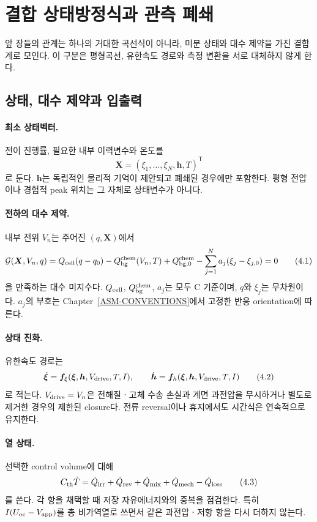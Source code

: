 \section{결합 상태방정식과 관측 폐쇄}\label{BAL-CH4}

앞 장들의 관계는 하나의 거대한 곡선식이 아니라, 미분 상태와
대수 제약을 가진 결합계로 모인다. 이 구분은 평형곡선, 유한속도
경로와 측정 변환을 서로 대체하지 않게 한다.

\subsection{상태, 대수 제약과 입출력}

\paragraph{ 최소 상태벡터.}
전이 진행률, 필요한 내부 이력변수와 온도를
\[
 \bm X=(\xi_1,\ldots,\xi_N,\bm h,T)^{\mathsf T}
\]
로 둔다. $\bm h$는 독립적인 물리적 기억이 제안되고 폐쇄된 경우에만
포함한다. 평형 전압이나 경험적 peak 위치는 그 자체로 상태변수가
아니다.

\paragraph{ 전하의 대수 제약.}
내부 전위 $V_n$는 주어진 $(q,\bm X)$에서
\[
 \mathcal G(\bm X,V_n,q)
 =Q_{\mathrm{cell}}(q-q_0)-Q_{\mathrm{bg}}^{\mathrm{chem}}(V_n,T)
 +Q_{\mathrm{bg},0}^{\mathrm{chem}}
 -\sum_{j=1}^{N}a_j(\xi_j-\xi_{j,0})=0
 \tag{4.1}
\]
을 만족하는 대수 미지수다. $Q_{\mathrm{cell}}$, $Q_{\mathrm{bg}}^{\mathrm{chem}}$, $a_j$는 모두
C 기준이며, $q$와 $\xi_j$는 무차원이다. $a_j$의 부호는
Chapter~\ref{ASM-CONVENTIONS}에서 고정한 반응 orientation에 따른다.

\paragraph{ 상태 진화.}
유한속도 경로는
\[
 \dot{\bm\xi}=\bm f_\xi(\bm\xi,\bm h,V_{\mathrm{drive}},T,I),\qquad
 \dot{\bm h}=\bm f_h(\bm\xi,\bm h,V_{\mathrm{drive}},T,I)
 \tag{4.2}
\]
로 적는다. $V_{\mathrm{drive}}=V_n$은 전해질ㆍ고체 수송 손실과 계면
과전압을 무시하거나 별도로 제거한 경우의 제한된 closure다.
전류 reversal이나 휴지에서도 시간식은 연속적으로 유지한다.

\paragraph{ 열 상태.}
선택한 control volume에 대해
\[
 C_\mathrm{th}\dot T
 =\dot Q_{\mathrm{irr}}+\dot Q_{\mathrm{rev}}+\dot Q_{\mathrm{mix}}+\dot Q_{\mathrm{mech}}
 -\dot Q_{\mathrm{loss}}
 \tag{4.3}
\]
를 쓴다. 각 항을 채택할 때 저장 자유에너지와의 중복을 점검한다.
특히 $I(U_\mathrm{oc}-V_{\mathrm{app}})$를 총 비가역열로 쓰면서 같은
과전압ㆍ저항 항을 다시 더하지 않는다.

